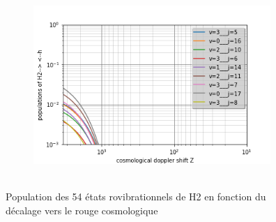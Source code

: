 \documentclass[10pt, a4paper]{report}
\numberwithin{equation}{subsection}
\begin{document}
\begin{figure}[]
\begin{subfigure}{0.5\textwidth}
\end{subfigure}
\begin{subfigure}{0.5\textwidth}
\centering
\includegraphics[width=9cm,height=7cm]{levelsh2-h.5.png}
\end{subfigure}

\caption{Population des 54 états rovibrationnels de H2 en fonction du décalage vers le rouge cosmologique}
\label{fig:POPH2}
\end{figure}

\end{document}
